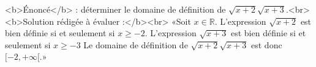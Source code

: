 <b>Énoncé</b> : déterminer le domaine de définition de $\sqrt{x+2}\sqrt{x+3}$.<br> <b>Solution rédigée à évaluer :</b><br>  «Soit $x\in\mathbb{R}$.  L'expression $\sqrt{x+2}$ est bien définie si et seulement si $x\geq -2$. L'expression $\sqrt{x+3}$ est bien définie si et seulement si $x\geq -3$ Le domaine de définition de $\sqrt{x+2}\sqrt{x+3}$ est donc $[-2,+\infty[$.»

\begin{reponses}
\end{reponses}

